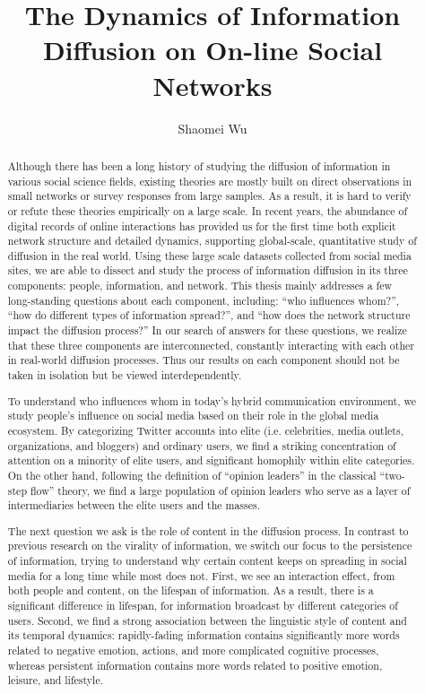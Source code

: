 \documentclass[phd,tocprelim]{cornell}
\title {The Dynamics of Information Diffusion on On-line Social Networks}
\author {Shaomei Wu}
\begin{document}
\maketitle
\makecopyright

\begin{abstract}
Although there has been a long history of studying the diffusion of information in various social science fields, existing theories are mostly built on direct observations in small networks or survey responses from large samples. As a result, it is hard to verify or refute these theories empirically on a large scale. In recent years, the abundance of digital records of online interactions has provided us for the first time both explicit network structure and detailed dynamics, supporting global-scale, quantitative study of diffusion in the real world. Using these large scale datasets collected from social media sites, we are able to dissect and study the process of information diffusion in its three components: people, information, and network.
This thesis mainly addresses a few long-standing questions about each component, including: ``who influences whom?'',  ``how do different types of information spread?'',  and ``how does the network structure impact the diffusion process?'' In our search of answers for these questions, we realize that these three components are interconnected, constantly interacting with each other in real-world diffusion processes. Thus our results on each component should not be taken in isolation but be viewed interdependently. 

To understand who influences whom in today's hybrid communication environment, we study people's influence on social media based on their role in the global media ecosystem. By categorizing Twitter accounts into elite (i.e. celebrities, media outlets, organizations, and bloggers) and ordinary users, we find a striking concentration of attention on a minority of elite users, and significant homophily within elite categories. On the other hand, following the definition of ``opinion leaders'' in the classical ``two-step flow'' theory, we find a large population of opinion leaders who serve as a layer of intermediaries between the elite users and the masses. 

The next question we ask is the role of content in the diffusion process. In contrast to previous research on the virality of information, we switch our focus to the persistence of information, trying to understand why certain content keeps on spreading in social media for a long time while most does not. First, we see an interaction effect, from both people and content, on the lifespan of information. As a result, there is a significant difference in lifespan, for information broadcast by different categories of users. Second, we find a strong association between the linguistic style of content and its temporal dynamics: rapidly-fading information contains significantly more words related to negative emotion, actions, and more complicated cognitive processes, whereas persistent information contains more words related to positive emotion, leisure, and lifestyle.
 

\end{abstract}
\end{document}
